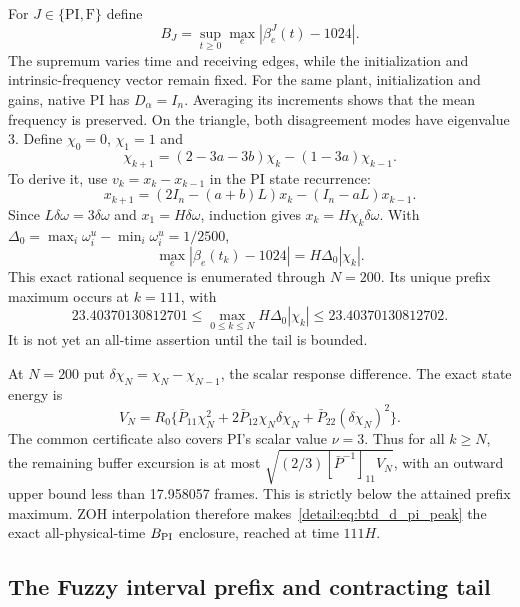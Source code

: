 For $J\in\{\mathrm{PI},\mathrm F\}$ define
\begin{equation}
 B_J=\sup_{t\ge0}\max_e|\beta_e^J(t)-1024|.
 \label{detail:eq:btd_excursion}
\end{equation}
The supremum varies time and receiving edges, while the initialization
and intrinsic-frequency vector remain fixed. For the same plant, initialization and gains, native PI has
$D_\alpha=I_n$. Averaging its increments shows that the mean frequency is
preserved. On the triangle, both disagreement modes have eigenvalue 3.
Define $\chi_0=0$, $\chi_1=1$ and
\begin{equation}
 \chi_{k+1}=(2-3a-3b)\chi_k-(1-3a)\chi_{k-1}.
 \label{detail:eq:btd_pi_scalar}
\end{equation}
To derive it, use $v_k=x_k-x_{k-1}$ in the PI state recurrence:
\[
 x_{k+1}=(2I_n-(a+b)L)x_k-(I_n-aL)x_{k-1}.
\]
Since $L\delta\omega=3\delta\omega$ and $x_1=H\delta\omega$,
induction gives $x_k=H\chi_k\delta\omega$. With
$\Delta_0=\max_i\omega_i^u-\min_i\omega_i^u=1/2500$,
\begin{equation}
 \max_e|\beta_e(t_k)-1024|=H\Delta_0|\chi_k|.
 \label{detail:eq:btd_d_pi_deviation}
\end{equation}
This exact rational sequence is enumerated through $N=200$. Its unique
prefix maximum occurs at $k=111$, with
\begin{equation}
 23.40370130812701\le
 \max_{0\le k\le N}H\Delta_0|\chi_k|\le23.40370130812702.
 \label{detail:eq:btd_d_pi_peak}
\end{equation}
It is not yet an all-time assertion until the tail is bounded.

At $N=200$ put $\delta\chi_N=\chi_N-\chi_{N-1}$, the scalar response difference. The exact state energy is
\begin{equation}
 V_N=R_0\{\bar P_{11}\chi_N^2+2\bar P_{12}\chi_N\delta\chi_N+\bar P_{22}(\delta\chi_N)^2\}.
 \label{detail:eq:btd_d_pi_VN}
\end{equation}
The common certificate also covers PI's scalar value $\nu=3$. Thus for
all $k\ge N$, the remaining buffer excursion is at most
$\sqrt{(2/3)[\bar P^{-1}]_{11}V_N}$, with an outward upper bound
less than 17.958057 frames. This is strictly below the attained prefix
maximum. ZOH interpolation therefore makes~\eqref{detail:eq:btd_d_pi_peak}
the exact all-physical-time $B_{\rm PI}$ enclosure, reached at time $111H$.

\subsection{The Fuzzy interval prefix and contracting tail}

